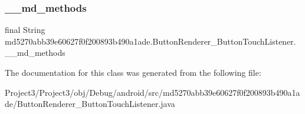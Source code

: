 \subsubsection{\texorpdfstring{\+\_\+\+\_\+md\+\_\+methods}{\_\_md\_methods}}
{\footnotesize\ttfamily final String md5270abb39e60627f0f200893b490a1ade.\+Button\+Renderer\+\_\+\+Button\+Touch\+Listener.\+\_\+\+\_\+md\+\_\+methods\hspace{0.3cm}{\ttfamily [static]}}



The documentation for this class was generated from the following file\+:\begin{DoxyCompactItemize}
\item 
Project3/\+Project3/obj/\+Debug/android/src/md5270abb39e60627f0f200893b490a1ade/Button\+Renderer\+\_\+\+Button\+Touch\+Listener.\+java\end{DoxyCompactItemize}
